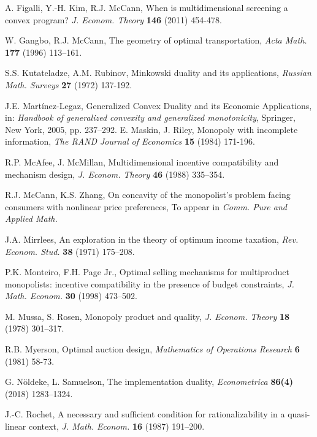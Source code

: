 \documentclass[a4paper, 11pt]{amsart}
\numberwithin{equation}{section}
\theoremstyle{plain}
\theoremstyle{definition}
\theoremstyle{remark}
\begin{document}
\begin{thebibliography}{BCDE}
	A. Figalli, Y.-H. Kim, R.J. McCann, 
	When is multidimensional screening a convex program? 
	{\em J. Econom. Theory} {\bf 146} (2011) 454-478.
	
{	 
	W. Gangbo, R.J. McCann, 
	The geometry of optimal transportation, 
	{\em Acta Math.} {\bf 177} (1996) 113–161.
}
	

{
	S.S. Kutateladze, A.M. Rubinov, 
	Minkowski duality and its applications, 
	{\em Russian Math. Surveys} {\bf 27}  (1972) 137-192.
}

	
{ 
	J.E. Martínez-Legaz, 
	Generalized Convex Duality and its Economic Applications, in: 
	{\em Handbook of generalized convexity and generalized monotonicity}, Springer, New York, 2005, pp. 237--292.	
}
{
	E. Maskin, J. Riley, 
	Monopoly with incomplete information, 
	{\em The RAND Journal of Economics} {\bf 15} (1984) 171-196.
}	
	

	
	R.P. McAfee, J. McMillan, 
	Multidimensional incentive compatibility and mechanism design, 
	{\em J. Econom. Theory} {\bf 46} (1988) 335–354.
		
	R.J. McCann, K.S. Zhang,
	On concavity of the monopolist's problem facing consumers with nonlinear price preferences,
	To appear in {\em Comm. Pure and Applied Math.}
		
	J.A. Mirrlees, 
	An exploration in the theory of optimum income taxation, 
	{\em Rev. Econom. Stud.} {\bf 38} (1971) 175–208.
	

	P.K. Monteiro, F.H. Page Jr., 
	Optimal selling mechanisms for multiproduct monopolists: incentive compatibility in the presence of budget constraints, 
	{\em J. Math. Econom.} {\bf 30} (1998) 473–502.


	M. Mussa, S. Rosen, 
	Monopoly product and quality, 
	{\em J. Econom. Theory} {\bf 18} (1978) 301–317.

{
	R.B. Myerson, 
	Optimal auction design, 
	{\em  Mathematics of Operations Research} {\bf 6} (1981) 58-73.
}

	G. N\"oldeke, L. Samuelson, 
	The implementation duality, 
	{\em Econometrica} {\bf 86(4)} (2018) 1283–1324.


	J.-C. Rochet,
	A necessary and sufficient condition for rationalizability in a quasi-linear context,
	{\em J. Math. Econom.} {\bf 16} (1987) 191--200.



\end{thebibliography}
\end{document}
